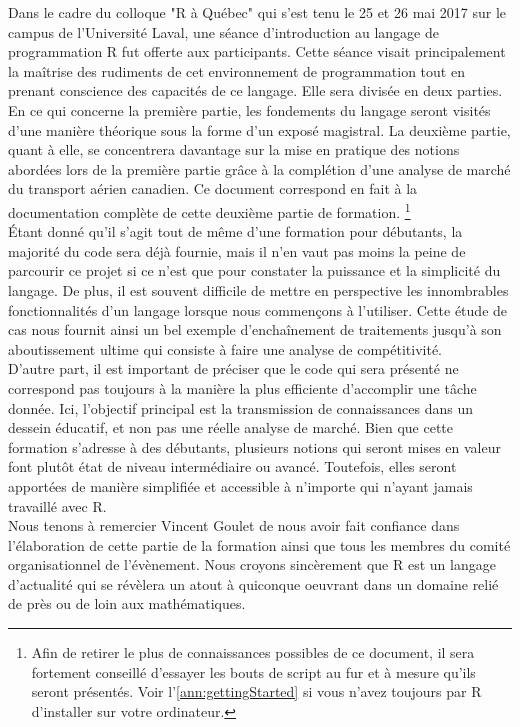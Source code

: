 Dans le cadre du colloque "R à Québec" qui s'est tenu le 25 et 26 mai 2017 sur le campus de l'Université Laval, une séance d'introduction au langage de programmation R fut offerte aux participants. Cette séance visait principalement la maîtrise des rudiments de cet environnement de programmation tout en prenant conscience des capacités de ce langage. \cite{RQC2017} Elle sera divisée en deux parties. En ce qui concerne la première partie, les fondements du langage seront visités d'une manière théorique sous la forme d'un exposé magistral. La deuxième partie, quant à elle, se concentrera davantage sur la mise en pratique des notions abordées lors de la première partie grâce à la complétion d'une analyse de marché du transport aérien canadien. Ce document correspond en fait à la documentation complète de cette deuxième partie de formation. \footnote{Afin de retirer le plus de connaissances possibles de ce document, il sera fortement conseillé d'essayer les bouts de script au fur et à mesure qu'ils seront présentés. Voir l'\autoref{ann:gettingStarted} si vous n'avez toujours par R d'installer sur votre ordinateur.} \\

Étant donné qu'il s'agit tout de même d'une formation pour débutants, la majorité du code sera déjà fournie, mais il n'en vaut pas moins la peine de parcourir ce projet si ce n'est que pour constater la puissance et la simplicité du langage. De plus, il est souvent difficile de mettre en perspective les innombrables fonctionnalités d'un langage lorsque nous commençons à l'utiliser. Cette étude de cas nous fournit ainsi un bel exemple d'enchaînement de traitements jusqu'à son aboutissement ultime qui consiste à faire une analyse de compétitivité. \\

D'autre part, il est important de préciser que le code qui sera présenté ne correspond pas toujours à la manière la plus efficiente d'accomplir une tâche donnée. Ici, l'objectif principal est la transmission de connaissances dans un dessein éducatif, et non pas une réelle analyse de marché. Bien que cette formation s'adresse à des débutants, plusieurs notions qui seront mises en valeur font plutôt état de niveau intermédiaire ou avancé. Toutefois, elles seront apportées de manière simplifiée et accessible à n'importe qui n'ayant jamais travaillé avec R. \\

Nous tenons à remercier Vincent Goulet de nous avoir fait confiance dans l'élaboration de cette partie de la formation ainsi que tous les membres du comité organisationnel de l'évènement. Nous croyons sincèrement que R est un langage d'actualité qui se révèlera un atout à quiconque oeuvrant dans un domaine relié de près ou de loin aux mathématiques.